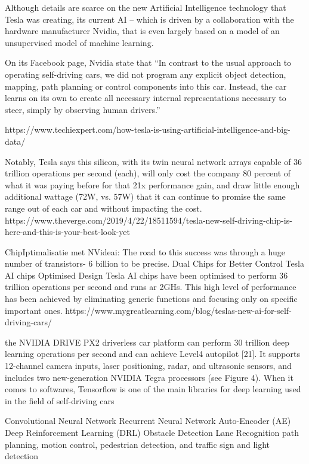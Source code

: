 Although details are scarce on the new Artificial Intelligence technology that Tesla was creating, its current AI – which is driven by a collaboration with the hardware manufacturer Nvidia, that is even largely based on a model of an unsupervised model of machine learning.

On its Facebook page, Nvidia state that “In contrast to the usual approach to operating self-driving cars, we did not program any explicit object detection, mapping, path planning or control components into this car. Instead, the car learns on its own to create all necessary internal representations necessary to steer, simply by observing human drivers.”

https://www.techiexpert.com/how-tesla-is-using-artificial-intelligence-and-big-data/

Notably, Tesla says this silicon, with its twin neural network arrays capable of 36 trillion operations per second (each), will only cost the company 80 percent of what it was paying before for that 21x performance gain, and draw little enough additional wattage (72W, vs. 57W) that it can continue to promise the same range out of each car and without impacting the cost.
https://www.theverge.com/2019/4/22/18511594/tesla-new-self-driving-chip-is-here-and-this-is-your-best-look-yet

ChipIptimalisatie met NVideai:
The road to this success was through a huge number of transistors- 6 billion to be precise.
Dual Chips for Better Control
Tesla AI chips Optimised Design
Tesla AI chips have been optimised to perform 36 trillion operations per second and runs ar 2GHs. This high level of performance has been achieved by eliminating generic functions and focusing only on specific important ones.
https://www.mygreatlearning.com/blog/teslas-new-ai-for-self-driving-cars/

the NVIDIA DRIVE PX2 driverless car platform
can perform 30 trillion deep learning operations per second and can achieve Level4 autopilot [21].
It supports 12-channel camera inputs, laser positioning, radar, and ultrasonic sensors, and includes
two new-generation NVIDIA Tegra processors (see Figure 4). When it comes to softwares, Tensorflow
is one of the main libraries for deep learning used in the field of self-driving cars

Convolutional Neural Network
Recurrent Neural Network
Auto-Encoder (AE)
Deep Reinforcement Learning (DRL)
Obstacle Detection
Lane Recognition
path planning, motion control, pedestrian detection,
and traffic sign and light detection


